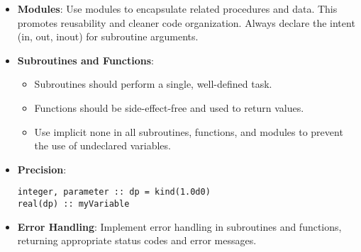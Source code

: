 \documentclass{ol-softwaremanual}
\begin{document}
\begin{itemize}
\item \textbf{Modules}: Use modules to encapsulate related procedures and data. This promotes reusability and cleaner code organization. Always declare the intent (in, out, inout) for subroutine arguments.

\item \textbf{Subroutines and Functions}: 
\begin{itemize}
    \item Subroutines should perform a single, well-defined task.
    \item Functions should be side-effect-free and used to return values.
    \item Use implicit none in all subroutines, functions, and modules to prevent the use of undeclared variables.
\end{itemize}

\item \textbf{Precision}:
\begin{example}
\begin{verbatim}
integer, parameter :: dp = kind(1.0d0)
real(dp) :: myVariable
\end{verbatim}
\end{example}
\item \textbf{Error Handling}: Implement error handling in subroutines and functions, returning appropriate status codes and error messages.
\end{itemize}
\end{document}
